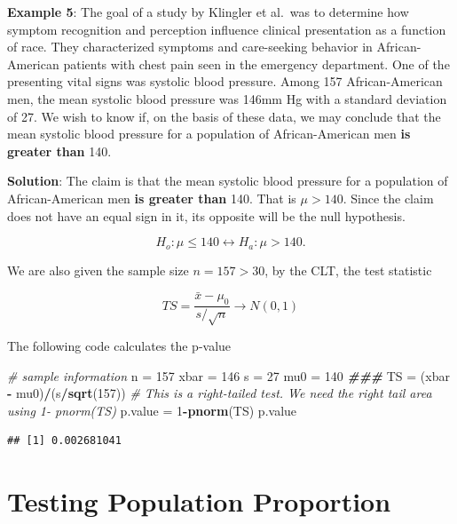 \documentclass[
]{book}
\newenvironment{Shaded}{\begin{snugshade}}{\end{snugshade}}
\newcommand{\CommentTok}[1]{\textcolor[rgb]{0.56,0.35,0.01}{\textit{#1}}}
\newcommand{\DecValTok}[1]{\textcolor[rgb]{0.00,0.00,0.81}{#1}}
\newcommand{\DocumentationTok}[1]{\textcolor[rgb]{0.56,0.35,0.01}{\textbf{\textit{#1}}}}
\newcommand{\FunctionTok}[1]{\textcolor[rgb]{0.13,0.29,0.53}{\textbf{#1}}}
\newcommand{\NormalTok}[1]{#1}
\newcommand{\OtherTok}[1]{\textcolor[rgb]{0.56,0.35,0.01}{#1}}
\newcommand{\SpecialCharTok}[1]{\textcolor[rgb]{0.81,0.36,0.00}{\textbf{#1}}}
\begin{document}
\textbf{Example 5}: The goal of a study by Klingler et al.~was to determine how symptom recognition and perception influence clinical presentation as a function of race. They characterized symptoms and care-seeking behavior in African-American patients with chest pain seen in the emergency department. One of the presenting vital signs was systolic blood
pressure. Among 157 African-American men, the mean systolic blood pressure was 146mm Hg with a standard deviation of 27. We wish to know if, on the basis of these data, we may conclude that the mean systolic blood pressure for a population of African-American men \textbf{is greater than} 140.

\textbf{Solution}: The claim is that the mean systolic blood pressure for a population of African-American men \textbf{is greater than} 140. That is \(\mu > 140\). Since the claim does not have an equal sign in it, its opposite will be the null hypothesis.

\[
H_o: \mu \le 140  \leftrightarrow  H_a: \mu > 140.
\]

We are also given the sample size \(n = 157 > 30\), by the CLT, the test statistic

\[
TS = \frac{\bar{x} - \mu_0}{s/\sqrt{n}} \to N(0,1)
\]

The following code calculates the p-value

\begin{Shaded}
\begin{Highlighting}[]
\CommentTok{\# sample information}
\NormalTok{n }\OtherTok{=} \DecValTok{157}
\NormalTok{xbar }\OtherTok{=} \DecValTok{146}
\NormalTok{s }\OtherTok{=} \DecValTok{27}
\NormalTok{mu0 }\OtherTok{=} \DecValTok{140}
\DocumentationTok{\#\#\#}
\NormalTok{TS }\OtherTok{=}\NormalTok{ (xbar }\SpecialCharTok{{-}}\NormalTok{ mu0)}\SpecialCharTok{/}\NormalTok{(s}\SpecialCharTok{/}\FunctionTok{sqrt}\NormalTok{(}\DecValTok{157}\NormalTok{))}
\CommentTok{\# This is a right{-}tailed test. We need the right tail area using 1{-} pnorm(TS)}
\NormalTok{p.value }\OtherTok{=} \DecValTok{1}\SpecialCharTok{{-}}\FunctionTok{pnorm}\NormalTok{(TS)}
\NormalTok{p.value}
\end{Highlighting}
\end{Shaded}

\begin{verbatim}
## [1] 0.002681041
\end{verbatim}

\hypertarget{testing-population-proportion}{%
\section{Testing Population Proportion}\label{testing-population-proportion}}
\end{document}
